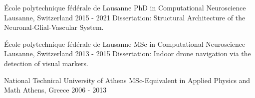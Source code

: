 


\begin{cventries}



\cventry
{École polytechnique fédérale de Lausanne} %
{PhD in Computational Neuroscience} %
{Lausanne, Switzerland} %
{2015 - 2021} %
{ %
    Dissertation: Structural Architecture of the Neuronal-Glial-Vascular System.
}


\end{cventries}

\begin{cventries}


\cventry
{École polytechnique fédérale de Lausanne} %
{MSc in Computational Neuroscience} %
{Lausanne, Switzerland} %
{2013 - 2015} %
{ %
    Dissertation: Indoor drone navigation via the detection of visual markers.
}


\end{cventries}

\begin{cventries}


\cventry
{National Technical University of Athens} %
{MSc-Equivalent in Applied Physics and Math} %
{Athens, Greece} %
{2006 - 2013} %
{ %
}


\end{cventries}
